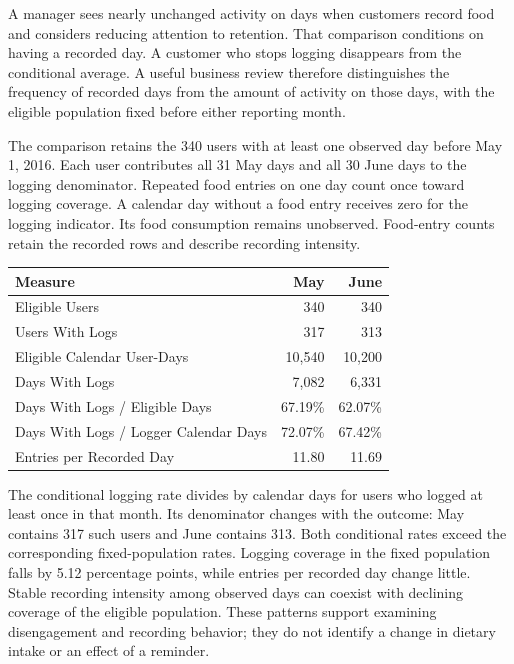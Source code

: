 \noindent A manager sees nearly unchanged activity on days when customers record
food and considers reducing attention to retention. That comparison
conditions on having a recorded day. A customer who stops logging
disappears from the conditional average. A useful business review
therefore distinguishes the frequency of recorded days from the amount
of activity on those days, with the eligible population fixed before
either reporting month.

The comparison retains the 340 users with at least one observed day
before May 1, 2016. Each user contributes all 31 May days and all 30
June days to the logging denominator. Repeated food entries on one day
count once toward logging coverage. A calendar day without a food entry
receives zero for the logging indicator. Its food consumption remains
unobserved. Food-entry counts retain the recorded rows and describe
recording intensity.

\begin{table}[H]
\centering\small
\begin{tabular}{@{}lrr@{}}
\toprule
Measure & May & June \\
\midrule

Eligible Users & 340 & 340 \\
Users With Logs & 317 & 313 \\
Eligible Calendar User-Days & 10,540 & 10,200 \\
Days With Logs & 7,082 & 6,331 \\
Days With Logs / Eligible Days & 67.19\% & 62.07\% \\
Days With Logs / Logger Calendar Days & 72.07\% & 67.42\% \\
Entries per Recorded Day & 11.80 & 11.69 \\
\bottomrule
\end{tabular}
\end{table}

The conditional logging rate divides by calendar days for users who
logged at least once in that month. Its denominator changes with the
outcome: May contains 317 such users and June contains 313. Both
conditional rates exceed the corresponding fixed-population rates.
Logging coverage in the fixed population falls by 5.12 percentage
points, while entries per recorded day change little. Stable recording
intensity among observed days can coexist with declining coverage of the
eligible population. These patterns support examining disengagement and
recording behavior; they do not identify a change in dietary intake or
an effect of a reminder.

